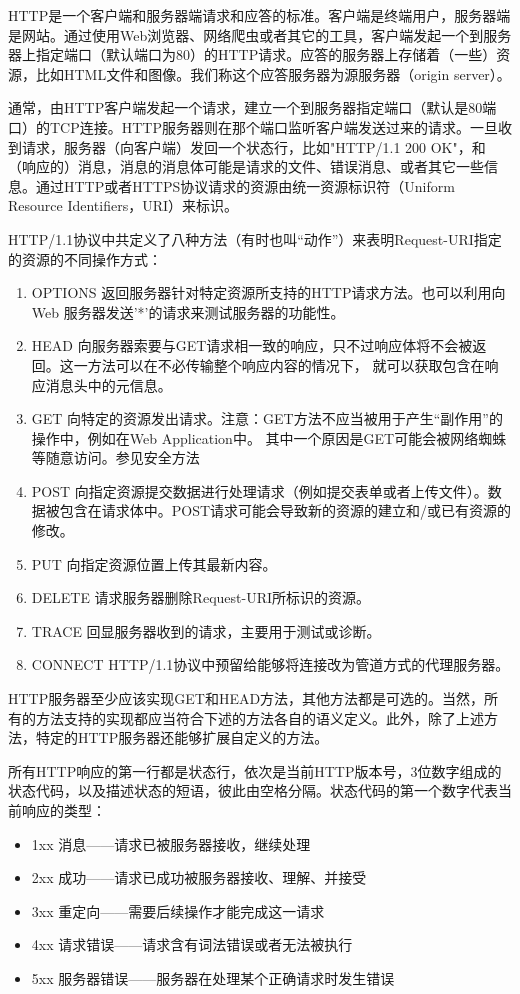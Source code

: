 \documentclass[twoside, xetex]{report}
\begin{document}
	HTTP是一个客户端和服务器端请求和应答的标准。客户端是终端用户，服务器端是网站。通过使用Web浏览器、网络爬虫或者其它的工具，客户端发起一个到服务器上指定端口（默认端口为80）的HTTP请求。应答的服务器上存储着（一些）资源，比如HTML文件和图像。我们称这个应答服务器为源服务器（origin server）。
	
	通常，由HTTP客户端发起一个请求，建立一个到服务器指定端口（默认是80端口）的TCP连接。HTTP服务器则在那个端口监听客户端发送过来的请求。一旦收到请求，服务器（向客户端）发回一个状态行，比如"HTTP/1.1 200 OK"，和（响应的）消息，消息的消息体可能是请求的文件、错误消息、或者其它一些信息。通过HTTP或者HTTPS协议请求的资源由统一资源标识符（Uniform Resource Identifiers，URI）来标识。
	
	HTTP/1.1协议中共定义了八种方法（有时也叫“动作”）来表明Request-URI指定的资源的不同操作方式：
	\begin{enumerate}
		\item OPTIONS 返回服务器针对特定资源所支持的HTTP请求方法。也可以利用向Web 服务器发送'*'的请求来测试服务器的功能性。
		\item HEAD 向服务器索要与GET请求相一致的响应，只不过响应体将不会被返回。这一方法可以在不必传输整个响应内容的情况下，
					就可以获取包含在响应消息头中的元信息。
		\item GET 向特定的资源发出请求。注意：GET方法不应当被用于产生“副作用”的操作中，例如在Web Application中。
					其中一个原因是GET可能会被网络蜘蛛等随意访问。参见安全方法
		\item POST 向指定资源提交数据进行处理请求（例如提交表单或者上传文件）。数据被包含在请求体中。POST请求可能会导致新的资源的建立和/或已有资源的修改。
		\item PUT 向指定资源位置上传其最新内容。
		\item DELETE 请求服务器删除Request-URI所标识的资源。
		\item TRACE 回显服务器收到的请求，主要用于测试或诊断。
		\item CONNECT HTTP/1.1协议中预留给能够将连接改为管道方式的代理服务器。
	\end{enumerate}
	
	HTTP服务器至少应该实现GET和HEAD方法，其他方法都是可选的。当然，所有的方法支持的实现都应当符合下述的方法各自的语义定义。此外，除了上述方法，特定的HTTP服务器还能够扩展自定义的方法。
	
	所有HTTP响应的第一行都是状态行，依次是当前HTTP版本号，3位数字组成的状态代码，以及描述状态的短语，彼此由空格分隔。状态代码的第一个数字代表当前响应的类型：
	\begin{itemize}
		\item 1xx 消息——请求已被服务器接收，继续处理
		\item 2xx 成功——请求已成功被服务器接收、理解、并接受
		\item 3xx 重定向——需要后续操作才能完成这一请求
		\item 4xx 请求错误——请求含有词法错误或者无法被执行
		\item 5xx 服务器错误——服务器在处理某个正确请求时发生错误
	\end{itemize}
\end{document}
